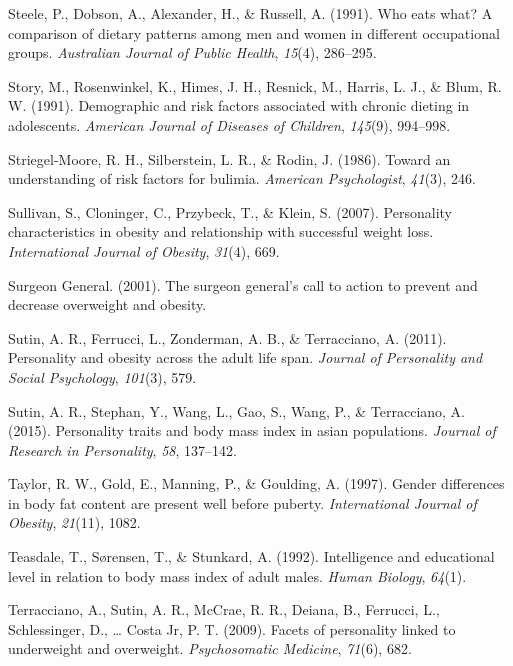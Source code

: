 \documentclass[man]{apa6}
\begin{document}
\leavevmode\hypertarget{ref-steele1991eats}{}%
Steele, P., Dobson, A., Alexander, H., \& Russell, A. (1991). Who eats what? A comparison of dietary patterns among men and women in different occupational groups. \emph{Australian Journal of Public Health}, \emph{15}(4), 286--295.

\leavevmode\hypertarget{ref-story1991demographic}{}%
Story, M., Rosenwinkel, K., Himes, J. H., Resnick, M., Harris, L. J., \& Blum, R. W. (1991). Demographic and risk factors associated with chronic dieting in adolescents. \emph{American Journal of Diseases of Children}, \emph{145}(9), 994--998.

\leavevmode\hypertarget{ref-striegel1986toward}{}%
Striegel-Moore, R. H., Silberstein, L. R., \& Rodin, J. (1986). Toward an understanding of risk factors for bulimia. \emph{American Psychologist}, \emph{41}(3), 246.

\leavevmode\hypertarget{ref-sullivan2007personality}{}%
Sullivan, S., Cloninger, C., Przybeck, T., \& Klein, S. (2007). Personality characteristics in obesity and relationship with successful weight loss. \emph{International Journal of Obesity}, \emph{31}(4), 669.

\leavevmode\hypertarget{ref-office2001surgeon}{}%
Surgeon General. (2001). The surgeon general's call to action to prevent and decrease overweight and obesity.

\leavevmode\hypertarget{ref-sutin2011personality}{}%
Sutin, A. R., Ferrucci, L., Zonderman, A. B., \& Terracciano, A. (2011). Personality and obesity across the adult life span. \emph{Journal of Personality and Social Psychology}, \emph{101}(3), 579.

\leavevmode\hypertarget{ref-sutin2015personality}{}%
Sutin, A. R., Stephan, Y., Wang, L., Gao, S., Wang, P., \& Terracciano, A. (2015). Personality traits and body mass index in asian populations. \emph{Journal of Research in Personality}, \emph{58}, 137--142.

\leavevmode\hypertarget{ref-taylor1997gender}{}%
Taylor, R. W., Gold, E., Manning, P., \& Goulding, A. (1997). Gender differences in body fat content are present well before puberty. \emph{International Journal of Obesity}, \emph{21}(11), 1082.

\leavevmode\hypertarget{ref-teasdale1992intelligence}{}%
Teasdale, T., Sørensen, T., \& Stunkard, A. (1992). Intelligence and educational level in relation to body mass index of adult males. \emph{Human Biology}, \emph{64}(1).

\leavevmode\hypertarget{ref-terracciano2009facets}{}%
Terracciano, A., Sutin, A. R., McCrae, R. R., Deiana, B., Ferrucci, L., Schlessinger, D., \ldots{} Costa Jr, P. T. (2009). Facets of personality linked to underweight and overweight. \emph{Psychosomatic Medicine}, \emph{71}(6), 682.
\end{document}
